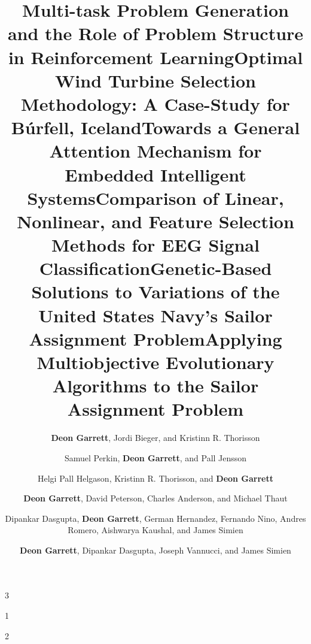 \documentclass[a4paper,10pt]{cvclean}
\begin{document}
\begin{publications}
  \begin{journalarticles}
    \begin{paper}
      \title{Multi-task Problem Generation and the Role of Problem Structure in
        Reinforcement Learning}
      \author{\textbf{Deon Garrett}, Jordi Bieger, and Kristinn R. Thorisson}
    \end{paper}
    \begin{paper}
      \title{Optimal Wind Turbine Selection Methodology: A Case-Study for
        Búrfell, Iceland}
      \author{Samuel Perkin, \textbf{Deon Garrett}, and Pall Jensson}
	  \num{3}
    \end{paper}
    \begin{paper}
      \title{Towards a General Attention Mechanism for Embedded Intelligent
        Systems}
      \author{Helgi Pall Helgason, Kristinn R. Thorisson, and \textbf{Deon
          Garrett}}
      \num{1}
    \end{paper}
    \begin{paper}
      \title{Comparison of Linear, Nonlinear, and Feature Selection Methods for
        EEG Signal Classification}
      \author{\textbf{Deon Garrett}, David Peterson, Charles Anderson, and Michael Thaut}
      \num{2}
    \end{paper}
  \end{journalarticles}

  \begin{bookchapters}
    \begin{paper}
      \title{Genetic-Based Solutions to Variations of the United States Navy's
        Sailor Assignment Problem}
      \author{Dipankar Dasgupta, \textbf{Deon Garrett}, German Hernandez, Fernando Nino,
        Andres Romero, Aishwarya Kaushal, and James Simien}
    \end{paper}
    \begin{paper}
      \title{Applying Multiobjective Evolutionary Algorithms to the Sailor
        Assignment Problem}
      \author{\textbf{Deon Garrett}, Dipankar Dasgupta, Joseph Vannucci, and James
        Simien}
    \end{paper}
  \end{bookchapters}


\end{publications}
\end{document}
